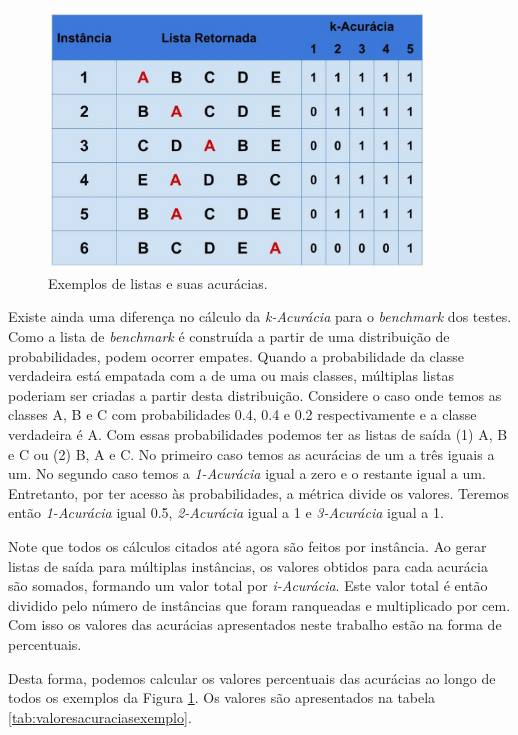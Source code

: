 \begin{figure}[h!]
  \centering
  \includegraphics[width=100mm,scale=0.7]{images/descricaodostestes01.eps}
  \caption{Exemplos de listas e suas acurácias.}
  \label{fig:descricaodostestes01}
\end{figure}

Existe ainda uma diferença no cálculo da \textit{k-Acurácia} para o \textit{benchmark} dos testes.
Como a lista de \textit{benchmark} é construída a partir de uma distribuição de probabilidades, podem ocorrer empates.
Quando a probabilidade da classe verdadeira está empatada com a de uma ou mais classes, múltiplas listas poderiam ser criadas a partir desta distribuição.
Considere o caso onde temos as classes A, B e C com probabilidades 0.4, 0.4 e 0.2 respectivamente e a classe verdadeira é A.
Com essas probabilidades podemos ter as listas de saída (1) A, B e C ou (2) B, A e C.
No primeiro caso temos as acurácias de um a três iguais a um.
No segundo caso temos a \textit{1-Acurácia} igual a zero e o restante igual a um.
Entretanto, por ter acesso às probabilidades, a métrica divide os valores.
Teremos então \textit{1-Acurácia} igual 0.5, \textit{2-Acurácia} igual a 1 e \textit{3-Acurácia} igual a 1.

Note que todos os cálculos citados até agora são feitos por instância. 
Ao gerar listas de saída para múltiplas instâncias, os valores obtidos para cada acurácia são somados, formando um valor total por \textit{i-Acurácia}.
Este valor total é então dividido pelo número de instâncias que foram ranqueadas e multiplicado por cem.
Com isso os valores das acurácias apresentados neste trabalho estão na forma de percentuais.

Desta forma, podemos calcular os valores percentuais das acurácias ao longo de todos os exemplos da Figura \ref{fig:descricaodostestes01}.
Os valores são apresentados na tabela \ref{tab:valoresacuraciasexemplo}.

